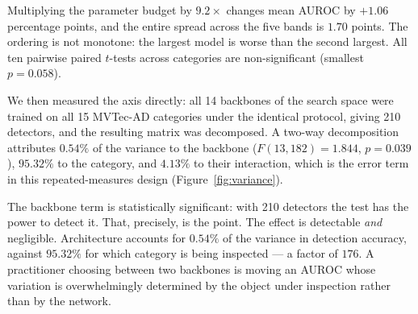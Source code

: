 \begin{table}[t]
\centering
\caption{Parameter-capacity bands. Each band restricts the search to backbones
whose deployed size falls inside the band; the selected backbone is then trained
with the identical protocol on all 15 MVTec-AD categories.}
\label{tab:capacity_null}

\end{table}

Multiplying the parameter budget by $9.2\times$ changes mean AUROC by
$+1.06$ percentage points, and the entire spread across the five bands is
$1.70$ points. The ordering is not monotone: the largest model is worse than the
second largest. All ten pairwise paired $t$-tests across categories are
non-significant (smallest $p = 0.058$).

We then measured the axis directly: all 14 backbones of the search space were
trained on all 15 MVTec-AD categories under the identical protocol, giving 210
detectors, and the resulting matrix was decomposed. A two-way decomposition
attributes \textbf{$0.54\%$} of the variance to the backbone
($F(13,182) = 1.844$, $p = 0.039$), \textbf{$95.32\%$} to the category, and
$4.13\%$ to their interaction, which is the error term in this repeated-measures
design (Figure~\ref{fig:variance}).

The backbone term is statistically significant: with 210 detectors the test has
the power to detect it. That, precisely, is the point. The effect is detectable
\emph{and} negligible. Architecture accounts for $0.54\%$ of the variance in
detection accuracy, against $95.32\%$ for which category is being inspected --- a
factor of $176$. A practitioner choosing between two backbones is moving an
AUROC whose variation is overwhelmingly determined by the object under
inspection rather than by the network.


